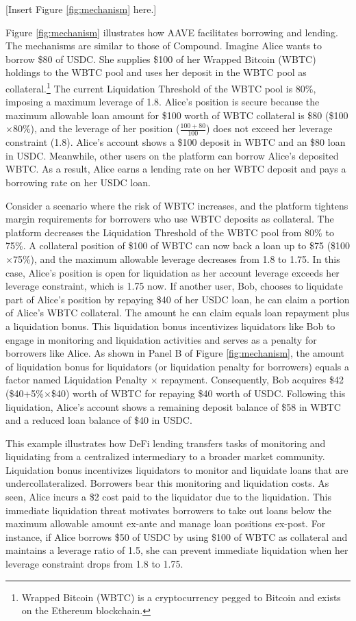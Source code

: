\documentclass[12pt]{article}
\begin{document}
     \centerline{[Insert Figure \ref{fig:mechanism} here.]}
 
 Figure \ref{fig:mechanism} illustrates how AAVE facilitates borrowing and lending. The mechanisms are similar to those of Compound. Imagine Alice wants to borrow \$80 of USDC. She supplies \$100 of her Wrapped Bitcoin (WBTC) holdings to the WBTC pool and uses her deposit in the WBTC pool as collateral.\footnote{Wrapped Bitcoin (WBTC) is a cryptocurrency pegged to Bitcoin and exists on the Ethereum blockchain.} The current Liquidation Threshold of the WBTC pool is 80\%, imposing a maximum leverage of 1.8. Alice's position is secure because the maximum allowable loan amount for \$100 worth of WBTC collateral is \$80 (\$100$\times$80\%), and the leverage of her position ($\frac{100+80}{100}$) does not exceed her leverage constraint (1.8). Alice's account shows a \$100 deposit in WBTC and an \$80 loan in USDC. Meanwhile, other users on the platform can borrow Alice's deposited WBTC. As a result, Alice earns a lending rate on her WBTC deposit and pays a borrowing rate on her USDC loan.
 

 Consider a scenario where the risk of WBTC increases, and the platform tightens margin requirements for borrowers who use WBTC deposits as collateral. The platform decreases the Liquidation Threshold of the WBTC pool from 80\% to 75\%. A collateral position of \$100 of WBTC can now back a loan up to \$75 (\$100$\times$75\%), and the maximum allowable leverage decreases from 1.8 to 1.75. In this case, Alice's position is open for liquidation as her account leverage exceeds her leverage constraint, which is 1.75 now. If another user, Bob, chooses to liquidate part of Alice's position by repaying \$40 of her USDC loan, he can claim a portion of Alice's WBTC collateral. The amount he can claim equals loan repayment plus a liquidation bonus. This liquidation bonus incentivizes liquidators like Bob to engage in monitoring and liquidation activities and serves as a penalty for borrowers like Alice. As shown in Panel B of Figure \ref{fig:mechanism}, the amount of liquidation bonus for liquidators (or liquidation penalty for borrowers) equals a factor named Liquidation Penalty $\times$ repayment. Consequently, Bob acquires \$42 (\$40+5\%$\times$\$40) worth of WBTC for repaying \$40 worth of USDC. Following this liquidation, Alice's account shows a remaining deposit balance of \$58 in WBTC and a reduced loan balance of \$40 in USDC.


 This example illustrates how DeFi lending transfers tasks of monitoring and liquidating from a centralized intermediary to a broader market community. Liquidation bonus incentivizes liquidators to monitor and liquidate loans that are undercollateralized. Borrowers bear this monitoring and liquidation costs. As seen, Alice incurs a \$2 cost paid to the liquidator due to the liquidation. This immediate liquidation threat motivates borrowers to take out loans below the maximum allowable amount ex-ante and manage loan positions ex-post. For instance, if Alice borrows \$50 of USDC by using \$100 of WBTC as collateral and maintains a leverage ratio of 1.5, she can prevent immediate liquidation when her leverage constraint drops from 1.8 to 1.75. 
 
\end{document}
